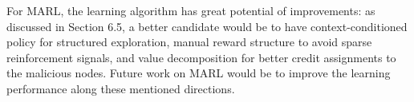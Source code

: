 \documentclass[a4paper,11pt]{article}
\begin{document}
For MARL, the learning algorithm has great potential of improvements: as discussed in Section 6.5, a better candidate would be to have context-conditioned policy for structured exploration, manual reward structure to avoid sparse reinforcement signals, and value decomposition for better credit assignments to the malicious nodes. Future work on MARL would be to improve the learning performance along these mentioned directions.



\end{document}
